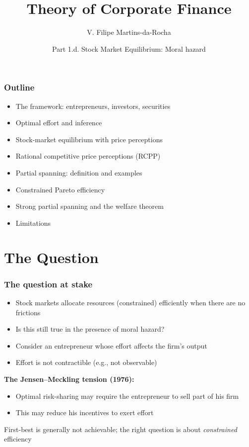 \documentclass[blue]{beamer}
\title[Corporate Finance]{Theory of Corporate Finance}
\author[Victor Filipe]{V. Filipe Martins-da-Rocha}
\institute[FGV EESP]{Escola de Economia de S\~ao Paulo}
\date[April--June, 2026]{Part 1.d. Stock Market Equilibrium: Moral hazard}
\theoremstyle{definition}
\theoremstyle{example}
\begin{document}
\frame{\titlepage}

\begin{frame}\frametitle{Outline}
\begin{itemize}
\item The framework: entrepreneurs, investors, securities
\item Optimal effort and inference
\item Stock-market equilibrium with price perceptions
\item Rational competitive price perceptions (RCPP)
\item Partial spanning: definition and examples
\item Constrained Pareto efficiency
\item Strong partial spanning and the welfare theorem
\item Limitations
\end{itemize}
\end{frame}

\section{The Question}

\begin{frame}\frametitle{The question at stake}
\begin{itemize}
\item Stock markets allocate resources (constrained) efficiently when there are no frictions
\item Is this still true in the presence of moral hazard?
\bigskip
\item Consider an entrepreneur whose effort affects the firm's output
\item Effort is not contractible (e.g., not observable)
\end{itemize}
\bigskip

\textbf{The Jensen--Meckling tension (1976):}
\begin{itemize}
\item Optimal risk-sharing may require the entrepreneur to sell part of his firm
\item This may reduce his incentives to exert effort
\end{itemize}
\bigskip

First-best is generally not achievable; the right question is about \emph{constrained} efficiency
\end{frame}
\end{document}
